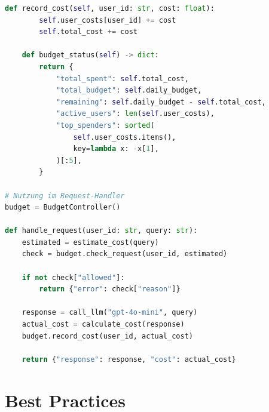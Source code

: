 \begin{lstlisting}[language=Python, caption=Budget-Controller mit Rate-Limiting]
    def record_cost(self, user_id: str, cost: float):
        self.user_costs[user_id] += cost
        self.total_cost += cost

    def budget_status(self) -> dict:
        return {
            "total_spent": self.total_cost,
            "total_budget": self.daily_budget,
            "remaining": self.daily_budget - self.total_cost,
            "active_users": len(self.user_costs),
            "top_spenders": sorted(
                self.user_costs.items(),
                key=lambda x: -x[1],
            )[:5],
        }

# Nutzung im Request-Handler
budget = BudgetController()

def handle_request(user_id: str, query: str):
    estimated = estimate_cost(query)
    check = budget.check_request(user_id, estimated)

    if not check["allowed"]:
        return {"error": check["reason"]}

    response = call_llm("gpt-4o-mini", query)
    actual_cost = calculate_cost(response)
    budget.record_cost(user_id, actual_cost)

    return {"response": response, "cost": actual_cost}
\end{lstlisting}


\section{Best Practices}

